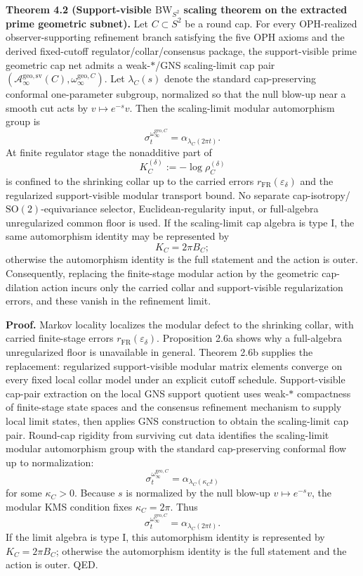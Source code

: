 \textbf{Theorem 4.2 (Support-visible \(\mathrm{BW}_{S^2}\) scaling theorem on the extracted prime geometric subnet).} Let \(C\subset S^2\) be a round cap. For every OPH-realized observer-supporting refinement branch satisfying the five OPH axioms and the derived fixed-cutoff regulator/collar/consensus package, the support-visible prime geometric cap net admits a weak-\(*\)/GNS scaling-limit cap pair \((\mathcal A_\infty^{\mathrm{geo,sv}}(C),\omega_\infty^{\mathrm{geo},C})\).
Let \(\lambda_C(s)\) denote the standard cap-preserving conformal one-parameter subgroup, normalized so that the null blow-up near a smooth cut acts by \(v\mapsto e^{-s}v\). Then the scaling-limit modular automorphism group is
\[
\sigma_t^{\omega_\infty^{\mathrm{geo},C}}
=
\alpha_{\lambda_C(2\pi t)}.
\]
At finite regulator stage the nonadditive part of
\[
K_C^{(\delta)}:=-\log \rho_C^{(\delta)}
\]
is confined to the shrinking collar up to the carried errors \(r_{\mathrm{FR}}(\varepsilon_\delta)\) and the regularized support-visible modular transport bound. No separate cap-isotropy/\(\mathrm{SO}(2)\)-equivariance selector, Euclidean-regularity input, or full-algebra unregularized common floor is used. If the scaling-limit cap algebra is type I, the same automorphism identity may be represented by
\[
K_C=2\pi B_C;
\]
otherwise the automorphism identity is the full statement and the action is outer. Consequently, replacing the finite-stage modular action by the geometric cap-dilation action incurs only the carried collar and support-visible regularization errors, and these vanish in the refinement limit.

\textbf{Proof.} Markov locality localizes the modular defect to the shrinking collar, with carried finite-stage errors \(r_{\mathrm{FR}}(\varepsilon_\delta)\). Proposition 2.6a shows why a full-algebra unregularized floor is unavailable in general. Theorem 2.6b supplies the replacement: regularized support-visible modular matrix elements converge on every fixed local collar model under an explicit cutoff schedule. Support-visible cap-pair extraction on the local GNS support quotient uses weak-\(*\) compactness of finite-stage state spaces and the consensus refinement mechanism to supply local limit states, then applies GNS construction to obtain the scaling-limit cap pair. Round-cap rigidity from surviving cut data identifies the scaling-limit modular automorphism group with the standard cap-preserving conformal flow up to normalization:
\[
\sigma_t^{\omega_\infty^{\mathrm{geo},C}}
=
\alpha_{\lambda_C(\kappa_C t)}
\]
for some \(\kappa_C>0\). Because \(s\) is normalized by the null blow-up \(v\mapsto e^{-s}v\), the modular KMS condition fixes \(\kappa_C=2\pi\). Thus
\[
\sigma_t^{\omega_\infty^{\mathrm{geo},C}}
=
\alpha_{\lambda_C(2\pi t)}.
\]
If the limit algebra is type I, this automorphism identity is represented by \(K_C=2\pi B_C\); otherwise the automorphism identity is the full statement and the action is outer. QED.

